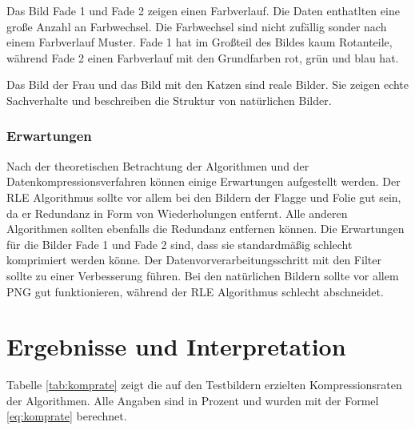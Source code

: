 \documentclass[conference]{IEEEtran}
\begin{document}
Das Bild Fade 1 und Fade 2 zeigen einen Farbverlauf.
Die Daten enthatlten eine große Anzahl an Farbwechsel.
Die Farbwechsel sind nicht zufällig sonder nach einem Farbverlauf Muster.
Fade 1 hat im Großteil des Bildes kaum Rotanteile, während
Fade 2 einen Farbverlauf mit den Grundfarben rot, grün und blau hat.

Das Bild der Frau und das Bild mit den Katzen sind reale Bilder.
Sie zeigen echte Sachverhalte und beschreiben die Struktur
von natürlichen Bilder.


\subsubsection{Erwartungen}

Nach der theoretischen Betrachtung der Algorithmen und der
Datenkompressionsverfahren können einige Erwartungen aufgestellt werden.
Der RLE Algorithmus sollte vor allem bei den Bildern der Flagge und Folie
gut sein, da er Redundanz in Form von Wiederholungen entfernt.
Alle anderen Algorithmen sollten ebenfalls die Redundanz entfernen können.
Die Erwartungen für die Bilder Fade 1 und Fade 2 sind, dass sie standardmäßig
schlecht komprimiert werden könne.
Der Datenvorverarbeitungsschritt mit den Filter sollte zu einer Verbesserung führen.
Bei den natürlichen Bildern sollte vor allem PNG gut funktionieren,
während der RLE Algorithmus schlecht abschneidet.



\section{Ergebnisse und Interpretation}

Tabelle \ref{tab:komprate} zeigt die auf den Testbildern erzielten
Kompressionsraten der Algorithmen.
Alle Angaben sind in Prozent und wurden mit der Formel \ref{eq:komprate} berechnet.
\end{document}
